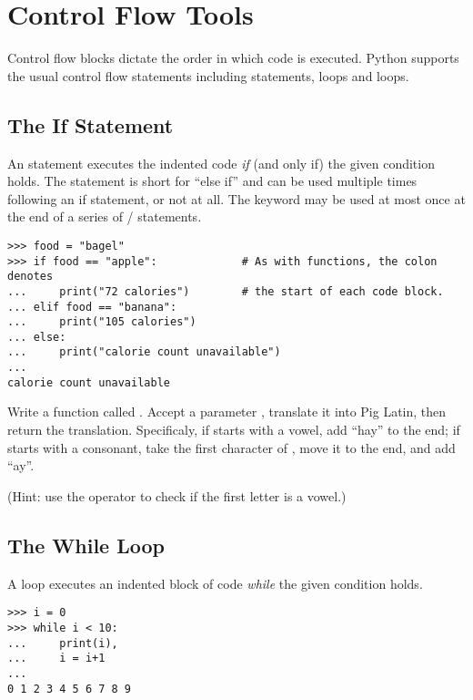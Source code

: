 
\section*{Control Flow Tools}
Control flow blocks dictate the order in which code is executed.
Python supports the usual control flow statements including  statements,  loops and  loops.

\subsection*{The If Statement}
An  statement executes the indented code \emph{if} (and only if) the given condition holds.
The  statement is short for ``else if'' and can be used multiple times following an if statement, or not at all. 
The  keyword may be used at most once at the end of a series of / statements.
\begin{lstlisting}
>>> food = "bagel"         
>>> if food == "apple":             # As with functions, the colon denotes
...     print("72 calories")        # the start of each code block.
... elif food == "banana":
...     print("105 calories")
... else: 
...     print("calorie count unavailable")
...     
calorie count unavailable
\end{lstlisting}

\begin{problem}
Write a function called .
Accept a parameter , translate it into Pig Latin, then return the translation.
Specificaly, if  starts with a vowel, add ``hay'' to the end; if  starts with a consonant, take the first character of , move it to the end, and add ``ay''.

(Hint: use the  operator to check if the first letter is a vowel.)
\end{problem}

\subsection*{The While Loop}
A  loop executes an indented block of code \emph{while} the given condition holds. 

\begin{lstlisting}
>>> i = 0
>>> while i < 10:        
...     print(i),            
...     i = i+1
...     
0 1 2 3 4 5 6 7 8 9
\end{lstlisting}

